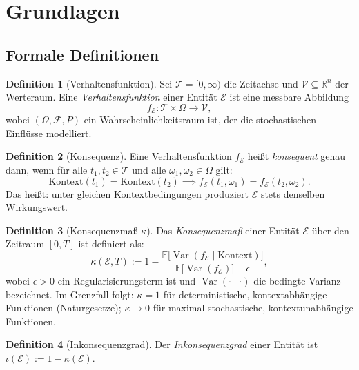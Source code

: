 ﻿\documentclass[a4paper,12pt]{article}
\DeclareMathOperator{\Var}{Var}
\theoremstyle{definition}
\newtheorem{definition}{Definition}
\begin{document}
\section{Grundlagen}

\subsection{Formale Definitionen}

\begin{definition}[Verhaltensfunktion]
Sei $\mathcal{T} = [0, \infty)$ die Zeitachse und $\mathcal{V} \subseteq \mathbb{R}^n$ der Werteraum. Eine \emph{Verhaltensfunktion} einer Entität $\mathcal{E}$ ist eine messbare Abbildung
\[
f_{\mathcal{E}}: \mathcal{T} \times \Omega \to \mathcal{V},
\]
wobei $(\Omega, \mathcal{F}, P)$ ein Wahrscheinlichkeitsraum ist, der die stochastischen Einflüsse modelliert.
\end{definition}

\begin{definition}[Konsequenz]
Eine Verhaltensfunktion $f_{\mathcal{E}}$ heißt \emph{konsequent} genau dann, wenn für alle $t_1, t_2 \in \mathcal{T}$ und alle $\omega_1, \omega_2 \in \Omega$ gilt:
\[
\text{Kontext}(t_1) = \text{Kontext}(t_2) \implies f_{\mathcal{E}}(t_1, \omega_1) = f_{\mathcal{E}}(t_2, \omega_2).
\]
Das heißt: unter gleichen Kontextbedingungen produziert $\mathcal{E}$ stets denselben Wirkungswert.
\end{definition}

\begin{definition}[Konsequenzmaß $\kappa$]
\label{def:kappa}
Das \emph{Konsequenzmaß} einer Entität $\mathcal{E}$ über den Zeitraum $[0, T]$ ist definiert als:
\[
\kappa(\mathcal{E}, T) := 1 - \frac{\mathbb{E}\bigl[\Var(f_{\mathcal{E}} \mid \text{Kontext})\bigr]}{\mathbb{E}\bigl[\Var(f_{\mathcal{E}})\bigr] + \epsilon},
\]
wobei $\epsilon > 0$ ein Regularisierungsterm ist und $\Var(\cdot \mid \cdot)$ die bedingte Varianz bezeichnet. Im Grenzfall folgt: $\kappa = 1$ für deterministische, kontextabhängige Funktionen (Naturgesetze); $\kappa \to 0$ für maximal stochastische, kontextunabhängige Funktionen.
\end{definition}

\begin{definition}[Inkonsequenzgrad]
Der \emph{Inkonsequenzgrad} einer Entität ist $\iota(\mathcal{E}) := 1 - \kappa(\mathcal{E})$.
\end{definition}
\end{document}
